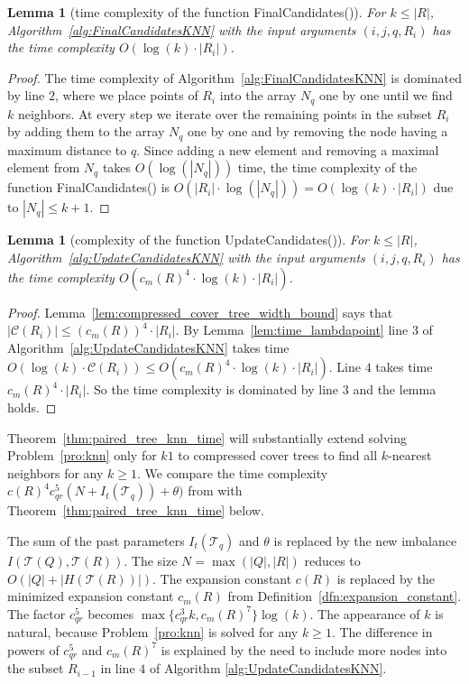 \documentclass[a4paper,UKenglish,cleveref, autoref]{lipics-v2019}
\numberwithin{algocf}{section}
\theoremstyle{definition}
\theoremstyle{definition}
\theoremstyle{definition}
\theoremstyle{plain}
\newtheorem{lem}[algocf]{Lemma}
\newcommand{\C}{\mathcal{C}}
\newcommand{\T}{\mathcal{T}}
\begin{document}
\begin{lem}[time complexity of the function FinalCandidates()]
\label{lem:FinalCandidates_knn_time}
For $k \leq |R|$, Algorithm~\ref{alg:FinalCandidatesKNN} with the input arguments $(i,j,q,R_i)$ has the time complexity $O(\log(k) \cdot |R_{i}|)$.
\end{lem}
\begin{proof}
The time complexity of Algorithm~\ref{alg:FinalCandidatesKNN} is dominated by line $2$, where we place points of $R_i$ into the array $N_q$ one by one until we find $k$ neighbors. 
At every step we iterate over the remaining points in the subset $R_i$ by adding them to the array $N_q$ one by one and by removing the node having a maximum distance to $q$. 
Since adding a new element and removing a maximal element from $N_q$ takes $O(\log(|N_q|))$ time, the time complexity of the function FinalCandidates() is $O(  |R_i| \cdot \log(|N_q|) )=O( \log(k) \cdot |R_{i}|)$ due to $|N_q| \leq k+1$.
\end{proof}

\begin{lem}[complexity of the function UpdateCandidates()]
\label{lem:UpdateCandidates_knn_time}
For $k \leq |R|$, Algorithm~\ref{alg:UpdateCandidatesKNN} with the input  arguments $(i,j,q,R_i)$ has the time complexity $O( c_m(R)^4 \cdot \log(k) \cdot |R_{i}|)$.
\end{lem}
\begin{proof}
Lemma~\ref{lem:compressed_cover_tree_width_bound} says that $|\C(R_i)| \leq (c_m(R))^4 \cdot |R_{i}|$.  
 By Lemma~\ref{lem:time_lambdapoint} line $3$ of Algorithm~\ref{alg:UpdateCandidatesKNN} takes time 
 $O(\log(k) \cdot \C(R_i)) \leq O(c_m(R)^4 \cdot \log(k) \cdot |R_{i}|)$. Line $4$ takes time $c_m(R)^4 \cdot |R_{i}|$.
So the time complexity is dominated by line $3$ and the lemma holds. 
\end{proof}

Theorem~\ref{thm:paired_tree_knn_time} will substantially extend {\cite[Theorem~2]{curtin2015plug}} solving Problem~\ref{pro:knn} only for $k1$ to compressed cover trees to find all $k$-nearest neighbors for any $k \geq 1$. 
We compare the time complexity $c(R)^4c^5_{qr}(N + I_t(\mathcal{T}_q)) + \theta)$ from \cite[Theorem~2]{curtin2015plug} with Theorem~\ref{thm:paired_tree_knn_time} below.
\medskip

The sum of the past parameters $I_t(\mathcal{T}_q)$ and $\theta$ is replaced by the new imbalance $I(\T(Q), \T(R))$. 
The size $N = \max(|Q|, |R|)$ reduces to $O(|Q| + |H(\T(R))|)$. 
The expansion constant $c(R)$ is replaced by the minimized expansion constant $c_m(R)$ from Definition~\ref{dfn:expansion_constant}. 
The factor $c^5_{qr}$ becomes $\max\{ c^3_{qr}k , c_m(R)^7\} \log(k)$.
The appearance of $k$ is natural, because Problem~\ref{pro:knn} is solved for any $k\geq 1$. 
The difference in powers of $c^{5}_{qr}$ and $c_m(R)^7$ is explained by the need to include more nodes into the subset $R_{i-1}$ in line $4$ of Algorithm \ref{alg:UpdateCandidatesKNN}.
\end{document}
